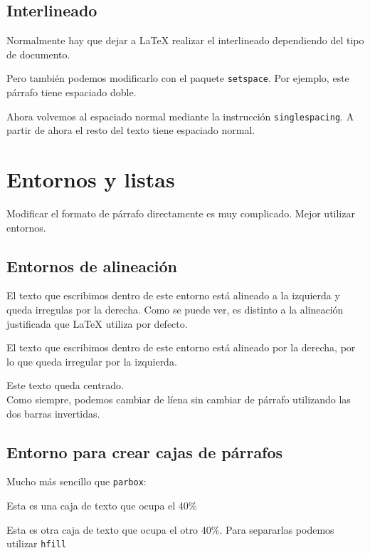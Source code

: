 \documentclass[11pt,twoside,a4paper]{article}
\begin{document}
\subsection{Interlineado}
\label{sec:interlineado}

Normalmente hay que dejar a \LaTeX{} realizar el interlineado dependiendo del tipo de documento.

\doublespacing
Pero también podemos modificarlo con el paquete \texttt{setspace}. Por ejemplo, este párrafo tiene espaciado doble.

\singlespacing
Ahora volvemos al espaciado normal mediante la instrucción \texttt{singlespacing}. A partir de ahora el resto del texto tiene espaciado normal.

\section{Entornos y listas}
\label{sec:entornosylistas}

Modificar el formato de párrafo directamente es muy complicado. Mejor utilizar entornos.

\subsection{Entornos de alineación}
\label{sec:entornoalineacion}

El texto que escribimos dentro de este entorno está alineado a la izquierda y queda irregulas por la derecha. Como se puede ver, es distinto a la alineación justificada que \LaTeX{} utiliza por defecto.

\begin{flushright}
  El texto que escribimos dentro de este entorno está alineado por la derecha, por lo que queda irregular por la izquierda.
\end{flushright}

\begin{center}
  Este texto queda centrado.\\
Como siempre, podemos cambiar de líena sin cambiar de párrafo utilizando las dos barras invertidas.
\end{center}

\subsection{Entorno para crear cajas de párrafos}
\label{sec:entornocajasparrafos}
Mucho más sencillo que \texttt{parbox}:

\begin{minipage}[l]{0.4\linewidth}
Esta es una caja de texto que ocupa el 40\%
\end{minipage}
\hfill{}
\begin{minipage}[r]{0.4\linewidth}
  Esta es otra caja de texto que ocupa el otro 40\%. Para separarlas podemos utilizar \texttt{hfill}
\end{minipage}
\end{document}
